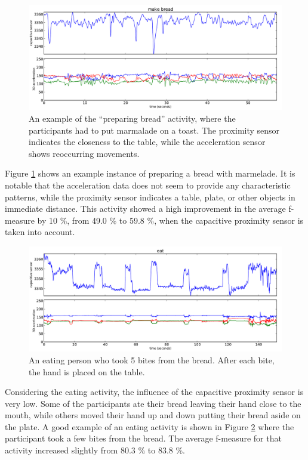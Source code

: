 \documentclass[runningheads,a4paper]{llncs}
\begin{document}
\begin{figure}[htpb]
	\centering
		\includegraphics[width=\textwidth]{../Auswertung/images/eugen_5.pdf}
	\caption{An example of the ``preparing bread'' activity, where the participants had to put marmalade on a toast. The proximity sensor indicates the closeness to the table, while the acceleration sensor shows reoccurring movements.}
	\label{fig:eugen_5}
\end{figure}

Figure \ref{fig:eugen_5} shows an example instance of preparing a bread with marmelade. It is notable that the acceleration data does not seem to provide any characteristic patterns, while the proximity sensor indicates a table, plate, or other objects in immediate distance. This activity showed a high improvement in the average f-measure by 10 \%, from 49.0 \% to 59.8 \%, when the capacitive proximity sensor is taken into account. 

\begin{figure}[htpb]
	\centering
		\includegraphics[width=\textwidth]{../Auswertung/images/eugen_6.pdf}
	\caption{An eating person who took 5 bites from the bread. After each bite, the hand is placed on the table.}
	\label{fig:eugen_6}
\end{figure}

Considering the eating activity, the influence of the capacitive proximity sensor is very low. Some of the participants ate their bread leaving their hand close to the mouth, while others moved their hand up and down putting their bread aside on the plate. A good example of an eating activity is shown in Figure \ref{fig:eugen_6} where the participant took a few bites from the bread. The average f-measure for that activity increased slightly from 80.3 \% to 83.8 \%. 
\end{document}
